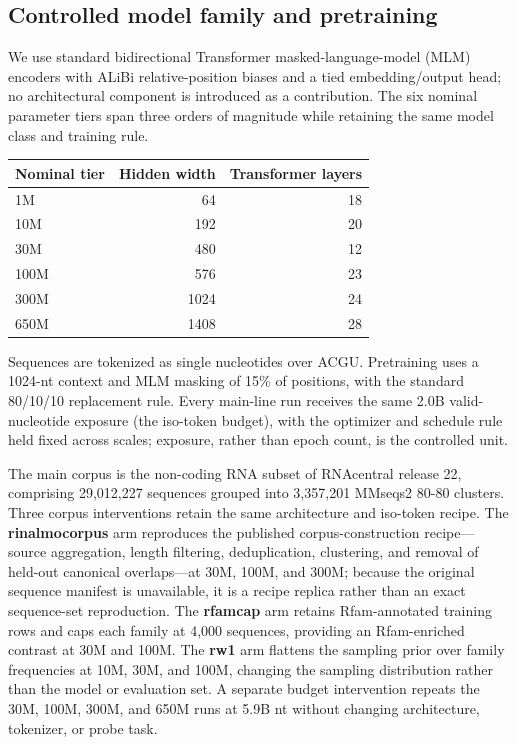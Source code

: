 \hypertarget{controlled-model-family-and-pretraining}{%
\subsection{Controlled model family and pretraining}\label{controlled-model-family-and-pretraining}}

We use standard bidirectional Transformer masked-language-model (MLM) encoders with ALiBi relative-position biases and a tied embedding/output head; no architectural component is introduced as a contribution. The six nominal parameter tiers span three orders of magnitude while retaining the same model class and training rule.

\begin{longtable}[]{@{}lrr@{}}
\toprule
Nominal tier & Hidden width & Transformer layers \\
\midrule
\endhead
1M & 64 & 18 \\
10M & 192 & 20 \\
30M & 480 & 12 \\
100M & 576 & 23 \\
300M & 1024 & 24 \\
650M & 1408 & 28 \\
\bottomrule
\end{longtable}

Sequences are tokenized as single nucleotides over ACGU. Pretraining uses a 1024-nt context and MLM masking of 15\% of positions, with the standard 80/10/10 replacement rule. Every main-line run receives the same 2.0B valid-nucleotide exposure (the iso-token budget), with the optimizer and schedule rule held fixed across scales; exposure, rather than epoch count, is the controlled unit.

The main corpus is the non-coding RNA subset of RNAcentral release 22, comprising 29,012,227 sequences grouped into 3,357,201 MMseqs2 80-80 clusters. Three corpus interventions retain the same architecture and iso-token recipe. The \textbf{rinalmocorpus} arm reproduces the published corpus-construction recipe---source aggregation, length filtering, deduplication, clustering, and removal of held-out canonical overlaps---at 30M, 100M, and 300M; because the original sequence manifest is unavailable, it is a recipe replica rather than an exact sequence-set reproduction. The \textbf{rfamcap} arm retains Rfam-annotated training rows and caps each family at 4,000 sequences, providing an Rfam-enriched contrast at 30M and 100M. The \textbf{rw1} arm flattens the sampling prior over family frequencies at 10M, 30M, and 100M, changing the sampling distribution rather than the model or evaluation set. A separate budget intervention repeats the 30M, 100M, 300M, and 650M runs at 5.9B nt without changing architecture, tokenizer, or probe task.

